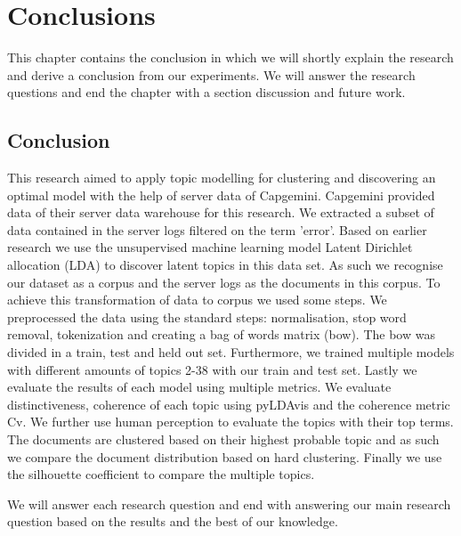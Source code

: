 \chapter{Conclusions} \label{ch:conclusions}
This chapter contains the conclusion in which we will shortly explain the research and derive a conclusion from our experiments. We will answer the research questions and end the chapter with a section discussion and future work.

\section{Conclusion}\label{conclusion:clonclusion}
This research aimed to apply topic modelling for clustering and discovering an optimal model with the help of server data of Capgemini. Capgemini provided data of their server data warehouse for this research. We extracted a subset of data contained in the server logs filtered on the term 'error'. Based on earlier research we use the unsupervised machine learning model Latent Dirichlet allocation (LDA) to discover latent topics in this data set. As such we recognise our dataset as a corpus and the server logs as the documents in this corpus. To achieve this transformation of data to corpus we used some steps.
We preprocessed the data using the standard steps: normalisation, stop word removal, tokenization and creating a bag of words matrix (bow). The bow was divided in a train, test and held out set. Furthermore, we trained multiple models with different amounts of topics {2-38} with our train and test set. Lastly we evaluate the results of each model using multiple metrics. We evaluate distinctiveness, coherence of each topic using pyLDAvis and the coherence metric Cv. We further use human perception to evaluate the topics with their top terms. The documents are clustered based on their highest probable topic and as such we compare the document distribution based on hard clustering. Finally we use the silhouette coefficient to compare the multiple topics. 

We will answer each research question and end with answering our main research question based on the results and the best of our knowledge.


